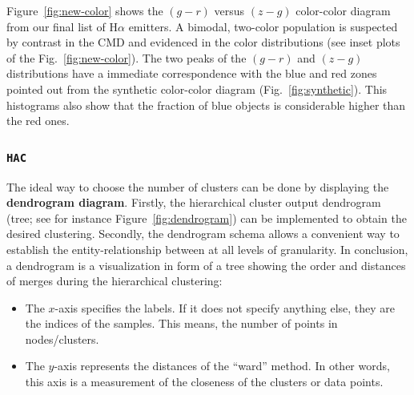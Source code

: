 \documentclass[fleqn,usenatbib]{mnras}
\begin{document}
Figure~\ref{fig:new-color} shows the $(g - r)$ versus $(z - g)$ color-color diagram from 
our final list of H{$\alpha$} emitters.
A bimodal, two-color population is suspected by contrast in the CMD and evidenced in the color distributions (see inset 
plots of the Fig.~\ref{fig:new-color}).
The two peaks of the $(g - r)$ and $(z - g)$ distributions have a immediate correspondence with the blue and red zones pointed out from the synthetic color-color diagram (Fig.~\ref{fig:synthetic}).
This histograms also
show that the fraction of blue objects is considerable higher than the red ones.

\subsubsection{\texttt{HAC}}

The ideal way to choose the number of clusters can be done by displaying the \textbf{dendrogram diagram}.
Firstly, the hierarchical cluster output dendrogram (tree; see for instance Figure~\ref{fig:dendrogram}) 
can be implemented to obtain the desired clustering. Secondly, the dendrogram schema allows 
a convenient way to establish the entity-relationship between at all levels of granularity.
In conclusion, a dendrogram is a visualization in form of a tree showing the order
and distances of merges during the hierarchical clustering:

\begin{itemize}
  
     \item The $x$-axis specifies the labels. If it does not specify anything else, they
           are the indices of the samples. This means, the number of points in nodes/clusters.
     \item The $y$-axis represents the distances of the ``ward'' method. In other words,
           this axis is a measurement of the closeness of the clusters or data points.
       
\end{itemize}
\end{document}

